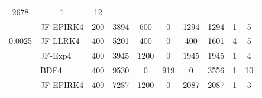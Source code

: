 \begin{table}[htb]
\begin{adjustbox}{width=0.9\columnwidth,center}
\begin{tabular}{cccccccccc}
			2678 & 1 & 12 \\
			\multicolumn{1}{l}{} & \multicolumn{1}{l}{JF-EPIRK4} & 200 & 3894 & 600 & 0 &
			1294 & 1294 & 1 & 5 \\
			\multicolumn{1}{l}{0.0025} & \multicolumn{1}{l}{JF-LLRK4} & 400 & 5201 & 400
			& 0 & 400 & 1601 & 4 & 5 \\
			\multicolumn{1}{l}{} & \multicolumn{1}{l}{JF-Exp4} & 400 & 3945 & 1200 & 0 &
			1945 & 1945 & 1 & 4 \\
			\multicolumn{1}{l}{} & \multicolumn{1}{l}{BDF4} & 400 & 9530 & 0 & 919 & 0 &
			3556 & 1 & 10 \\
			\multicolumn{1}{l}{} & \multicolumn{1}{l}{JF-EPIRK4} & 400 & 7287 & 1200 & 0 &
			2087 & 2087 & 1 & 3 \\
			\hline
		\end{tabular}
	\end{adjustbox}
	\label{tab:br}
\end{table}



